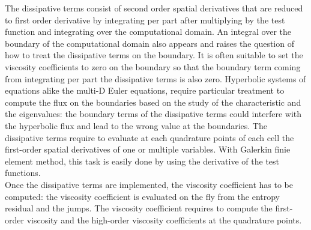 The dissipative terms consist of second order spatial derivatives that are reduced to first order derivative by integrating per part after multiplying by the test function and integrating over the computational domain. An integral over the boundary of the computational domain also appears and raises the question of how to treat the dissipative terms on the boundary. It is often suitable to set the viscosity coefficients to zero on the boundary so that the boundary term coming from integrating per part the dissipative terms is also zero. Hyperbolic systems of equations alike the multi-D Euler equations, require particular treatment to compute the flux on the boundaries based on the study of the characteristic and the eigenvalues: the boundary terms of the dissipative terms could interfere with the hyperbolic flux and lead to the wrong value at the boundaries. The dissipative terms require to evaluate at each quadrature points of each cell the first-order spatial derivatives of one or multiple variables. With Galerkin finie element method, this task is easily done by using the derivative of the test functions. \\
Once the dissipative terms are implemented, the viscosity coefficient has to be computed: the viscosity coefficient is evaluated on the fly from the entropy residual and the jumps. The viscosity coefficient requires to compute the first-order viscosity and the high-order viscosity coefficients at the quadrature points.